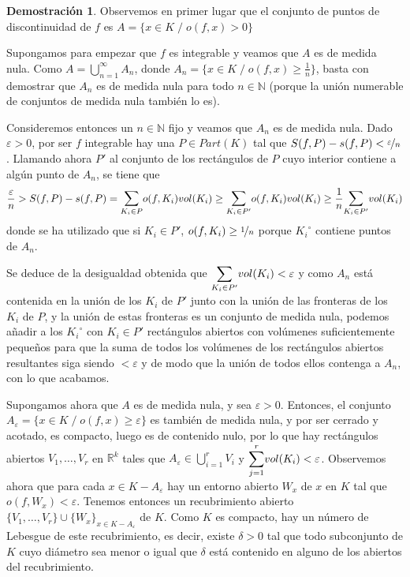 \documentclass[12pt,twoside]{report}
\theoremstyle{azul}
\theoremstyle{azul2}
\theoremstyle{plain}
\theoremstyle{definition}
\newtheorem*{dem}{Demostración}
\theoremstyle{remark}
\begin{document}
\begin{dem}
Observemos en primer lugar que el conjunto de puntos de discontinuidad de $f$ es $A = \{x\in K \; / \; o(f,x)> 0\}$

Supongamos para empezar que $f$ es integrable y veamos que $A$ es de medida nula. Como $A = \bigcup_{n = 1}^{\infty} A_n$, donde $A_n = \{x \in K \; / \; o(f,x) \geq \frac{1}{n}\}$, basta con demostrar que $A_n$ es de medida nula para todo $n \in \mathbb{N}$ (porque la unión numerable de conjuntos de medida nula también lo es).

Consideremos entonces un $n \in \mathbb{N}$ fijo y veamos que $A_n$ es de medida nula. Dado $\varepsilon > 0$, por ser $f$ integrable hay una $P \in Part(K)$ tal que $S(f,P) - s(f,P) < \nicefrac{\varepsilon}{n}$. Llamando ahora $P'$ al conjunto de los rectángulos de $P$ cuyo interior contiene a algún punto de $A_n$, se tiene que $$\dfrac{\varepsilon}{n} > S(f,P)-s(f,P) = \underset{K_i \in P}{\mathlarger{\sum}} o(f,K_i) vol(K_i) \geq \underset{K_i \in P'}{\mathlarger{\sum}} o(f,K_i) vol(K_i) \geq \dfrac{1}{n} \underset{K_i \in P'}{\mathlarger{\sum}} vol(K_i)$$
donde se ha utilizado que si $K_i \in P'$, $o(f,K_i) \geq \nicefrac{1}{n}$ porque ${K_i}^{\circ}$ contiene puntos de $A_n$.

Se deduce de la desigualdad obtenida que $\underset{K_i \in P'}{\mathlarger{\sum}} vol(K_i) < \varepsilon$ y como $A_n$ está contenida en la unión de los $K_i$ de $P'$ junto con la unión de las fronteras de los $K_i$ de $P$, y la unión de estas fronteras es un conjunto de medida nula, podemos añadir a los ${K_i}^{\circ}$ con $K_i \in P'$ rectángulos abiertos con volúmenes suficientemente pequeños para que la suma de todos los volúmenes de los rectángulos abiertos resultantes siga siendo $< \varepsilon$ y de modo que la unión de todos ellos contenga a $A_n$, con lo que acabamos.

Supongamos ahora que $A$ es de medida nula, y sea $\varepsilon > 0$. Entonces, el conjunto $A_{\varepsilon} = \{x \in K \; / \; o(f,x) \geq \varepsilon\}$ es también de medida nula, y por ser cerrado y acotado, es compacto, luego es de contenido nulo, por lo que hay rectángulos abiertos $V_1, \ldots, V_r$ en $\mathbb{R}^k$ tales que $A_{\varepsilon} \in \bigcup_{i=1}^r V_i$ y $\underset{j=1}{\mathlarger{\sum^r}} vol(K_i) < \varepsilon$. Observemos ahora que para cada $x \in K - A_{\varepsilon}$ hay un entorno abierto $W_x$ de $x$ en $K$ tal que $o(f,W_x) < \varepsilon$. Tenemos entonces un recubrimiento abierto $\{V_1, \ldots, V_r\} \cup \{W_x\}_{x \in K - A_{\varepsilon}}$ de $K$. Como $K$ es compacto, hay un número de Lebesgue de este recubrimiento, es decir, existe $\delta > 0$ tal que todo subconjunto de $K$ cuyo diámetro sea menor o igual que $\delta$ está contenido en alguno de los abiertos del recubrimiento.


\end{dem}
\end{document}
